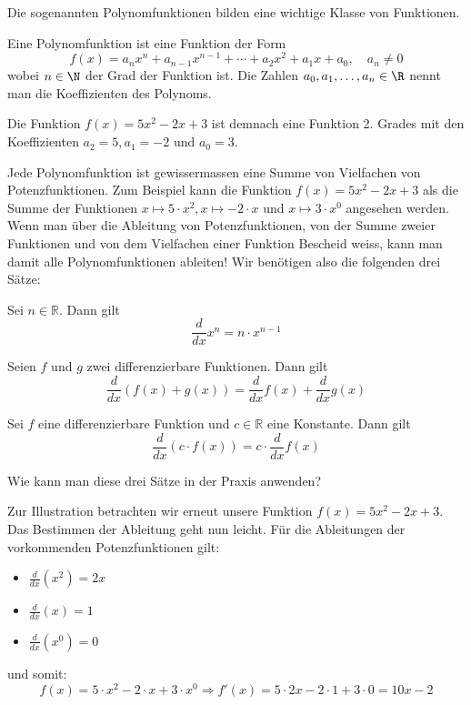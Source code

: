 \clearpage
Die sogenannten Polynomfunktionen bilden eine wichtige Klasse von Funktionen.
\begin{deff}
    [Polynomfunktion]{}
    Eine Polynomfunktion ist eine Funktion der Form
    $$f(x)=a_n x^n+a_{n-1} x^{n-1}+\cdots + a_2 x^2+a_1 x+a_0,\quad a_n\neq0$$
    wobei $n\in \N$ der Grad der Funktion ist.
    Die Zahlen $a_0,a_1,\ldots ,a_n \in \R$ nennt man die Koeffizienten des Polynoms.
\end{deff}

\begin{example}
    Die Funktion $f(x)=5x^2-2x+3$ ist demnach eine Funktion 2. Grades mit den Koeffizienten $a_2=5, a_1=-2$ und $a_0=3$.
\end{example}

Jede Polynomfunktion ist gewissermassen eine Summe von Vielfachen von Potenzfunktionen. Zum Beispiel kann die Funktion $f(x)=5x^2-2x+3$ als die Summe der Funktionen $x\mapsto 5\cdot x^2, x\mapsto -2\cdot x$ und $x\mapsto 3\cdot x^0$ angesehen werden. Wenn man über die Ableitung von Potenzfunktionen, von der Summe zweier Funktionen und von dem Vielfachen einer Funktion Bescheid weiss, kann man damit alle Polynomfunktionen ableiten! Wir benötigen also die folgenden drei Sätze:
\begin{theo}
    {}\label{satz:AbleitungPotenzfu}
    Sei $n\in \mathbb{R}$. Dann gilt
    $$\frac{d}{dx} x^n = n\cdot x^{n-1}$$
\end{theo}

\begin{theo}
    {}
    Seien $f$ und $g$ zwei differenzierbare Funktionen. Dann gilt
    $$\frac{d}{dx} \left(f(x)+g(x)\right) = \frac{d}{dx} f(x) + \frac{d}{dx} g(x)$$
\end{theo}

\begin{theo}
    {}
    Sei $f$ eine differenzierbare Funktion und $c\in \mathbb{R}$ eine Konstante. Dann gilt
    $$\frac{d}{dx}\left(c\cdot f(x)\right) = c\cdot \frac{d}{dx} f(x)$$
\end{theo}


Wie kann man diese drei Sätze in der Praxis anwenden?
\begin{example}
    Zur Illustration betrachten wir erneut unsere Funktion $f(x)=5x^2-2x+3$. Das Bestimmen der Ableitung geht nun leicht. Für die Ableitungen der vorkommenden Potenzfunktionen gilt:
    \begin{itemize}
        \item $\frac{d}{dx} (x^2 )=2x$
        \item $\frac{d}{dx}(x)=1$
        \item $\frac{d}{dx} (x^0 )=0$
    \end{itemize}
    und somit:
    $$ f(x)=5\cdot x^2-2\cdot x+3\cdot x^0 \Rightarrow f'(x)=5\cdot 2x-2\cdot 1+3\cdot 0=10x-2$$
\end{example}

